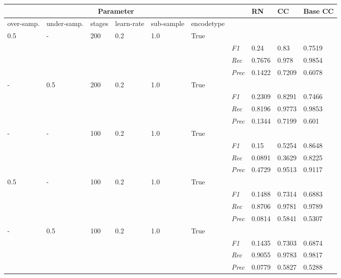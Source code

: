     \begin{table}[]
    \tiny
    \tabcolsep=0.11cm
    \begin{tabularx}{\textwidth}{XXXXXX|X|X|X|X}
    \toprule
    \multicolumn{6}{c}{Parameter} & & RN &  CC & Base CC \\ \midrule
    over-\newline samp. & under-\newline samp. & stages &learn-\newline rate & sub-\newline sample & encode\newline type & & & & \\ \midrule
    0.5 & - & 200 & 0.2 & 1.0 &True & & & & \\
    & & & & & & \textit{F1} & 0.24 & 0.83   & 0.7519     \\
    & & & & & & \textit{Rec} &  0.7676 & 0.978 & 0.9854   \\
    & & & & & & \textit{Prec} & 0.1422 & 0.7209 & 0.6078 \\ \midrule
    - & 0.5 & 200 & 0.2 & 1.0 &True & & & & \\
    & & & & & & \textit{F1} & 0.2309 & 0.8291   & 0.7466     \\
    & & & & & & \textit{Rec} &  0.8196 & 0.9773 & 0.9853   \\
    & & & & & & \textit{Prec} & 0.1344 & 0.7199 & 0.601 \\ \midrule
    - & - & 100 & 0.2 & 1.0 &True & & & & \\
    & & & & & & \textit{F1} & 0.15 & 0.5254   & 0.8648     \\
    & & & & & & \textit{Rec} &  0.0891 & 0.3629 & 0.8225   \\
    & & & & & & \textit{Prec} & 0.4729 & 0.9513 & 0.9117 \\ \midrule
    0.5 & - & 100 & 0.2 & 1.0 &True & & & & \\
    & & & & & & \textit{F1} & 0.1488 & 0.7314   & 0.6883     \\
    & & & & & & \textit{Rec} &  0.8706 & 0.9781 & 0.9789   \\
    & & & & & & \textit{Prec} & 0.0814 & 0.5841 & 0.5307 \\ \midrule
    - & 0.5 & 100 & 0.2 & 1.0 &True & & & & \\
    & & & & & & \textit{F1} & 0.1435 & 0.7303   & 0.6874     \\
    & & & & & & \textit{Rec} &  0.9055 & 0.9783 & 0.9817   \\
    & & & & & & \textit{Prec} & 0.0779 & 0.5827 & 0.5288 \\ \midrule

\end{tabularx}
\end{table}
